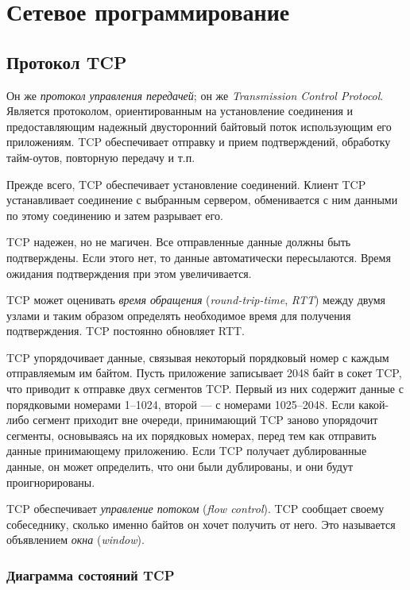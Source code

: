 \chapter{Сетевое программирование}
\label{ch:network}

\section{Протокол TCP}
\label{sec:tcp}
Он же \emph{протокол управления передачей}; он же \emph{Transmission Control Protocol}. Является протоколом, ориентированным на установление соединения и предоставляющим надежный двусторонний байтовый поток использующим его приложениям. TCP обеспечивает отправку и прием подтверждений, обработку тайм-оутов, повторную передачу и т.п.

Прежде всего, TCP обеспечивает установление соединений. Клиент TCP устанавливает соединение с выбранным сервером, обменивается с ним данными по этому соединению и затем разрывает его.

TCP надежен, но не магичен. Все отправленные данные должны быть подтверждены. Если этого нет, то данные автоматически пересылаются. Время ожидания подтверждения при этом увеличивается.

TCP может оценивать \emph{время обращения} (\emph{round-trip-time}, \emph{RTT}) между двумя узлами и таким образом определять необходимое время для получения подтверждения. TCP постоянно обновляет RTT.

TCP упорядочивает данные, связывая некоторый порядковый номер с каждым отправляемым им байтом. Пусть приложение записывает 2048 байт в сокет TCP, что приводит к отправке двух сегментов TCP. Первый из них содержит данные с порядковыми номерами 1--1024, второй --- с номерами 1025--2048. Если какой-либо сегмент приходит вне очереди, принимающий TCP заново упорядочит сегменты, основываясь на их порядковых номерах, перед тем как отправить данные принимающему приложению. Если TCP получает дублированные данные, он может определить, что они были дублированы, и они будут проигнорированы.

TCP обеспечивает \emph{управление потоком} (\emph{flow control}). TCP сообщает своему собеседнику, сколько именно байтов он хочет получить от него. Это называется объявлением \emph{окна} (\emph{window}).

\subsection{Диаграмма состояний TCP}

